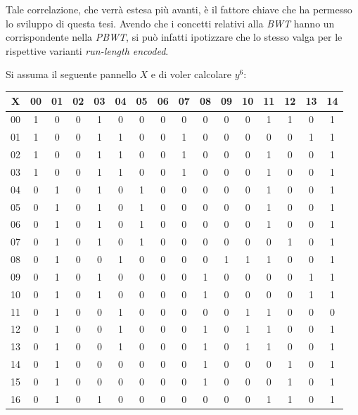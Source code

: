 Tale correlazione, che verrà estesa più avanti, è il fattore chiave che ha
permesso lo sviluppo di questa tesi. Avendo che i concetti relativi alla
\textit{BWT} hanno un corrispondente nella \textit{PBWT}, si può infatti
ipotizzare che lo stesso valga per le rispettive varianti \textit{run-length
  encoded}. 
\begin{esempio}
  \label{es:pbwt1}
  Si assuma il seguente pannello $X$ e di voler calcolare $y^6$:
  \begin{table}[H]
    \centering
    \scriptsize
    \begin{tabular}{c|ccccccccccccccc}
      X & 00 & 01 & 02 & 03 & 04 & 05 & 06 & 07 & 08 & 09 & 10 & 11 & 12 & 13
      & 14 \\
      \hline
      00 & 1 & 0 & 0 & 1 & 0 & 0 & 0 & 0 & 0 & 0 & 0 & 1 & 1 & 0 & 1 \\
      01 & 1 & 0 & 0 & 1 & 1 & 0 & 0 & 1 & 0 & 0 & 0 & 0 & 0 & 1 & 1 \\
      02 & 1 & 0 & 0 & 1 & 1 & 0 & 0 & 1 & 0 & 0 & 0 & 1 & 0 & 0 & 1 \\
      03 & 1 & 0 & 0 & 1 & 1 & 0 & 0 & 1 & 0 & 0 & 0 & 1 & 0 & 0 & 1 \\
      04 & 0 & 1 & 0 & 1 & 0 & 1 & 0 & 0 & 0 & 0 & 0 & 1 & 0 & 0 & 1 \\
      05 & 0 & 1 & 0 & 1 & 0 & 1 & 0 & 0 & 0 & 0 & 0 & 1 & 0 & 0 & 1 \\
      06 & 0 & 1 & 0 & 1 & 0 & 1 & 0 & 0 & 0 & 0 & 0 & 1 & 0 & 0 & 1 \\
      07 & 0 & 1 & 0 & 1 & 0 & 1 & 0 & 0 & 0 & 0 & 0 & 0 & 1 & 0 & 1 \\
      08 & 0 & 1 & 0 & 0 & 1 & 0 & 0 & 0 & 0 & 1 & 1 & 1 & 0 & 0 & 1 \\
      09 & 0 & 1 & 0 & 1 & 0 & 0 & 0 & 0 & 1 & 0 & 0 & 0 & 0 & 1 & 1 \\
      10 & 0 & 1 & 0 & 1 & 0 & 0 & 0 & 0 & 1 & 0 & 0 & 0 & 0 & 1 & 1 \\
      11 & 0 & 1 & 0 & 0 & 1 & 0 & 0 & 0 & 0 & 0 & 1 & 1 & 0 & 0 & 0 \\
      12 & 0 & 1 & 0 & 0 & 1 & 0 & 0 & 0 & 1 & 0 & 1 & 1 & 0 & 0 & 1 \\
      13 & 0 & 1 & 0 & 0 & 1 & 0 & 0 & 0 & 1 & 0 & 1 & 1 & 0 & 0 & 1 \\
      14 & 0 & 1 & 0 & 0 & 0 & 0 & 0 & 0 & 1 & 0 & 0 & 0 & 1 & 0 & 1 \\
      15 & 0 & 1 & 0 & 0 & 0 & 0 & 0 & 0 & 1 & 0 & 0 & 0 & 1 & 0 & 1 \\
      16 & 0 & 1 & 0 & 1 & 0 & 0 & 0 & 0 & 0 & 0 & 0 & 1 & 1 & 0 & 1 \\

\end{tabular}
\end{table}
\end{esempio}
